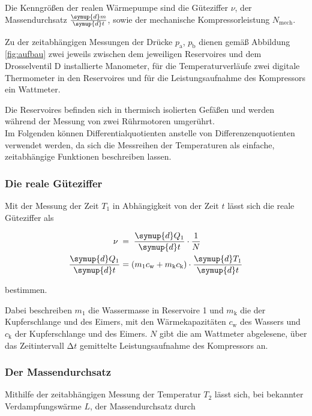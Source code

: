 Die Kenngrößen der realen Wärmepumpe sind die Güteziffer $\nu$, der 
Massendurchsatz $\frac{\symup{d}m}{\symup{d}t}$, sowie der mechanische 
Kompressorleistung $N_\text{mech}$.

Zu der zeitabhängigen Messungen der Drücke $p_\text{a}$, $p_\text{b}$ 
dienen gemäß Abbildung \ref{fig:aufbau}  zwei jeweils zwischen dem jeweiligen Reservoires und dem 
Drosselventil D installierte Manometer, für die Temperaturverläufe 
zwei digitale Thermometer in den Reservoires und für die Leistungsaufnahme
des Kompressors ein Wattmeter.

Die Reservoires befinden sich in thermisch isolierten Gefäßen und werden während
der Messung von zwei Rührmotoren umgerührt. \\

Im Folgenden können Differentialquotienten anstelle von Differenzenquotienten 
verwendet werden, da sich die Messreihen der Temperaturen als einfache, zeitabhängige
Funktionen beschreiben lassen.

\subsubsection{Die reale Güteziffer}


Mit der Messung der Zeit $T_1$ in Abhängigkeit von der Zeit $t$ lässt sich die
reale Güteziffer als

\begin{align}
    \nu \; &= \; \frac{\symup{d} Q_1}{\symup{d} t} \cdot \frac{1}{N} \\
    \frac{\symup{d} Q_1}{\symup{d} t} &= (m_1 c_\text{w} + m_\text{k} c_\text{k})
    \cdot \frac{\symup{d} T_1}{\symup{d} t}
\end{align}

bestimmen. 

Dabei beschreiben $m_1$ die Wassermasse in Reservoire 1 und $m_\text{k}$
die der Kupferschlange und des Eimers, mit den Wärmekapazitäten $c_\text{w}$ 
des Wassers und $c_\text{k}$ der Kupferschlange und des Eimers.
$N$ gibt die am Wattmeter abgelesene, über das Zeitintervall $\increment t$
gemittelte Leistungsaufnahme des Kompressors an.

\subsubsection{Der Massendurchsatz}

Mithilfe der zeitabhängigen Messung der Temperatur $T_2$ lässt sich, bei 
bekannter Verdampfungswärme $L$, der Massendurchsatz durch

